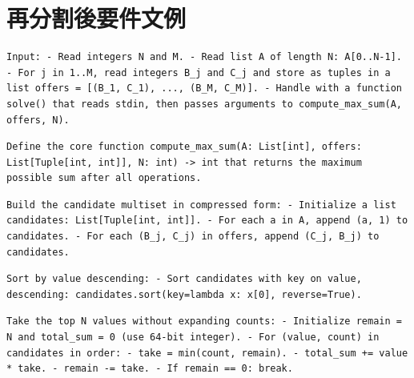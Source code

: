 \documentclass[11pt]{jreport}
\begin{document}
\section{再分割後要件文例}
\label{req_after_split}
\begin{description}[style=nextline]
  \item[\texttt{要件文1}]\par\noindent
\begin{Verbatim}[breaklines=true,breakanywhere=true,xleftmargin=\leftmargin]
Input: - Read integers N and M. - Read list A of length N: A[0..N-1]. - For j in 1..M, read integers B_j and C_j and store as tuples in a list offers = [(B_1, C_1), ..., (B_M, C_M)]. - Handle with a function solve() that reads stdin, then passes arguments to compute_max_sum(A, offers, N).
\end{Verbatim}

  \item[\texttt{要件文2}]\par\noindent
\begin{Verbatim}[breaklines=true,breakanywhere=true,xleftmargin=\leftmargin]
Define the core function compute_max_sum(A: List[int], offers: List[Tuple[int, int]], N: int) -> int that returns the maximum possible sum after all operations.
\end{Verbatim}

  \item[\texttt{要件文3}]\par\noindent
\begin{Verbatim}[breaklines=true,breakanywhere=true,xleftmargin=\leftmargin]
Build the candidate multiset in compressed form: - Initialize a list candidates: List[Tuple[int, int]]. - For each a in A, append (a, 1) to candidates. - For each (B_j, C_j) in offers, append (C_j, B_j) to candidates.
\end{Verbatim}

  \item[\texttt{要件文4}]\par\noindent
\begin{Verbatim}[breaklines=true,breakanywhere=true,xleftmargin=\leftmargin]
Sort by value descending: - Sort candidates with key on value, descending: candidates.sort(key=lambda x: x[0], reverse=True).
\end{Verbatim}

  \item[\texttt{要件文5}]\par\noindent
\begin{Verbatim}[breaklines=true,breakanywhere=true,xleftmargin=\leftmargin]
Take the top N values without expanding counts: - Initialize remain = N and total_sum = 0 (use 64-bit integer). - For (value, count) in candidates in order: - take = min(count, remain). - total_sum += value * take. - remain -= take. - If remain == 0: break.
\end{Verbatim}


\end{description}
\end{document}
